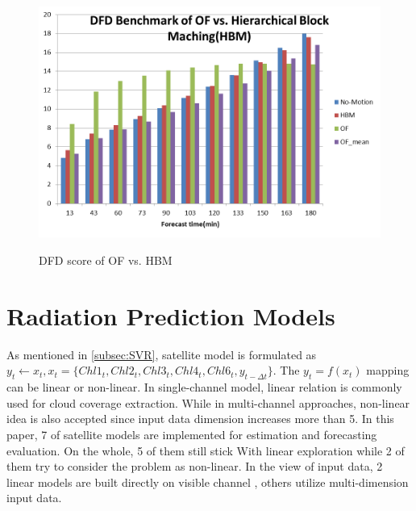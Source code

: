 \documentclass[conference]{IEEEtran}
\begin{document}



\begin{figure}[h]
\centering
\includegraphics[width=3 in]{DFD}
\label{fig:DFD}
\caption{DFD score of OF vs. HBM}
\end{figure}

\section{Radiation Prediction Models}
\label{sec:Models}

As mentioned in \ref{subsec:SVR}, satellite model is formulated as
$y_{t} \leftarrow x_{t}, x_{t}=\{Chl1_{t},Chl2_{t}, Chl3_{t}, Chl4_{t},
Chl6_{t}, y_{t-\Delta t}\}$. The $y_t = f(x_t)$ mapping can be linear or
non-linear. In single-channel model, linear relation is commonly used for cloud
coverage extraction. While in multi-channel approaches, non-linear idea is
also accepted since input data dimension increases more than 5. In this paper, 7
of satellite models are implemented for estimation and forecasting evaluation.
On the whole, 5 of them still stick With linear exploration while 2 of them try
to consider the problem as non-linear. In the view of input data, 2 linear
models are built directly on visible channel , others utilize
multi-dimension input data.
\end{document}
